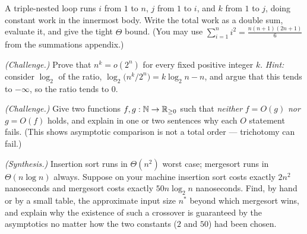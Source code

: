 \begin{exercise}\label{ch03:ex-nested}
A triple-nested loop runs $i$ from $1$ to $n$, $j$ from $1$ to $i$, and $k$ from $1$ to
$j$, doing constant work in the innermost body. Write the total work as a double sum,
evaluate it, and give the tight $\Theta$ bound. (You may use $\sum_{i=1}^n i^2 =
\frac{n(n+1)(2n+1)}{6}$ from the summations appendix.)
\end{exercise}

\begin{exercise}\label{ch03:ex-exp-beats-poly}
\emph{(Challenge.)} Prove that $n^k = o(2^n)$ for every fixed positive integer $k$.
\emph{Hint:} consider $\log_2$ of the ratio, $\log_2\!\bigl(n^k / 2^n\bigr) = k\log_2 n - n$,
and argue that this tends to $-\infty$, so the ratio tends to $0$.
\end{exercise}

\begin{exercise}\label{ch03:ex-incomparable}
\emph{(Challenge.)} Give two functions $f, g : \mathbb{N} \to \mathbb{R}_{\ge 0}$ such that
\emph{neither} $f = O(g)$ \emph{nor} $g = O(f)$ holds, and explain in one or two
sentences why each $O$ statement fails. (This shows asymptotic comparison is not a total
order --- trichotomy can fail.)
\end{exercise}

\begin{exercise}\label{ch03:ex-merge-vs-insertion}
\emph{(Synthesis.)} Insertion sort runs in $\Theta(n^2)$ worst case; mergesort runs in
$\Theta(n\log n)$ always. Suppose on your machine insertion sort costs exactly $2n^2$
nanoseconds and mergesort costs exactly $50 n\log_2 n$ nanoseconds. Find, by hand or by a
small table, the approximate input size $n^\ast$ beyond which mergesort wins, and explain
why the existence of such a crossover is guaranteed by the asymptotics no matter how the
two constants ($2$ and $50$) had been chosen.
\end{exercise}
